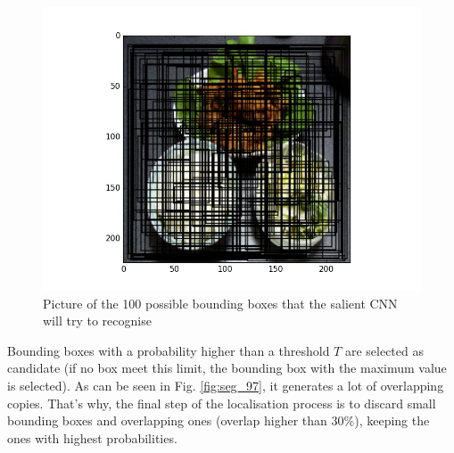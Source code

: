 \begin{figure}
    \centering
    \includegraphics[scale=0.5]{img/seg_100_bboxes.jpg}
    \caption{Picture of the 100 possible bounding boxes that the salient CNN will try to recognise}
    \label{fig:seg_100_bboxes}
\end{figure}

Bounding boxes with a probability higher than a threshold $T$ are selected as candidate (if no box meet this limit, the bounding box with the maximum value is selected). As can be seen in Fig. \ref{fig:seg_97}, it generates a lot of overlapping copies. That's why, the final step of the localisation process is to discard small bounding boxes and overlapping ones (overlap higher than 30\%), keeping the ones with highest probabilities.

